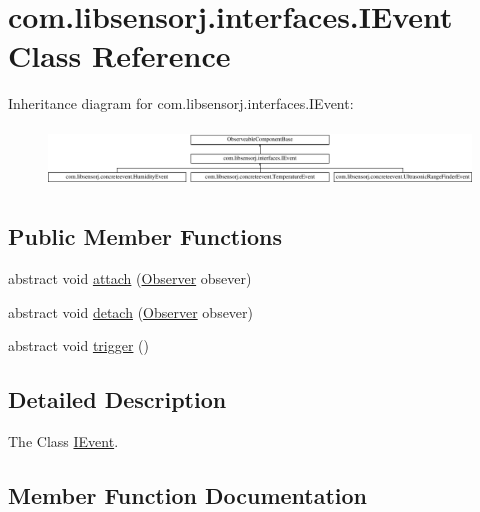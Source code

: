 \hypertarget{classcom_1_1libsensorj_1_1interfaces_1_1IEvent}{}\section{com.\+libsensorj.\+interfaces.\+I\+Event Class Reference}
\label{classcom_1_1libsensorj_1_1interfaces_1_1IEvent}
Inheritance diagram for com.\+libsensorj.\+interfaces.\+I\+Event\+:\begin{figure}[H]
\begin{center}
\leavevmode
\includegraphics[height=1.595442cm]{classcom_1_1libsensorj_1_1interfaces_1_1IEvent}
\end{center}
\end{figure}
\subsection*{Public Member Functions}
\begin{DoxyCompactItemize}
\item 
abstract void \hyperlink{classcom_1_1libsensorj_1_1interfaces_1_1IEvent_a7e3cbdca3cceb9345483cf019760b113}{attach} (\hyperlink{classcom_1_1libsensorj_1_1model_1_1Observer}{Observer} obsever)
\item 
abstract void \hyperlink{classcom_1_1libsensorj_1_1interfaces_1_1IEvent_aae7d245feed8380465149bfa36724244}{detach} (\hyperlink{classcom_1_1libsensorj_1_1model_1_1Observer}{Observer} obsever)
\item 
abstract void \hyperlink{classcom_1_1libsensorj_1_1interfaces_1_1IEvent_aa12268158f158fbb805b558efeb1bb67}{trigger} ()
\end{DoxyCompactItemize}


\subsection{Detailed Description}
The Class \hyperlink{classcom_1_1libsensorj_1_1interfaces_1_1IEvent}{I\+Event}. 

\subsection{Member Function Documentation}
\hypertarget{classcom_1_1libsensorj_1_1interfaces_1_1IEvent_a7e3cbdca3cceb9345483cf019760b113}{}
